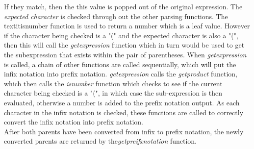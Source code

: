\documentclass[11pt]{article}
\begin{document}
 If they match, then the this value is popped out of the original expression. The \textit{expected character} is checked through out the other parsing functions. The textit{is\textunderscore number} function is used to return a number which is a leaf value. 
However if the character being checked is a "(" and the expected character is also a "(", then this will call the \textit{get\textunderscore expression} function which in turn would be used to get the subexpression that exists within the pair of parentheses. When  \textit{get\textunderscore expression} is called,  a chain of other functions are called sequentially, which will put the infix notation into prefix notation.
\textit{get\textunderscore expression} calls the \textit{get\textunderscore product} function, which then calls the \textit{is\textunderscore number} function which checks to see if the current character being checked is a "(", in which case the sub-expression is then evaluated, otherwise a number is added to the prefix notation output.  As each character in the infix notation is checked, these functions are called to correctly convert the infix notation into prefix notation. \\ 
After both parents have been converted from infix to prefix notation, the newly converted parents are returned by the\textit{get\textunderscore preifx\textunderscore notation} function.  
\end{document}
